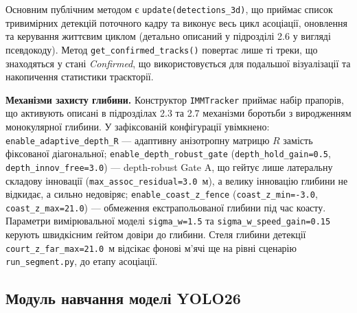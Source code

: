 Основним публічним методом є \texttt{update(detections\_3d)}, що приймає список
тривимірних детекцій поточного кадру та виконує весь цикл асоціації, оновлення та
керування життєвим циклом (детально описаний у підрозділі 2.6 у вигляді псевдокоду).
Метод \texttt{get\_confirmed\_tracks()} повертає лише ті треки, що знаходяться у
стані \textit{Confirmed}, що використовується для подальшої візуалізації та
накопичення статистики траєкторії.

\textbf{Механізми захисту глибини.} Конструктор \texttt{IMMTracker} приймає набір
прапорів, що активують описані в підрозділах 2.3 та 2.7 механізми боротьби з
виродженням монокулярної глибини. У зафіксованій конфігурації увімкнено:
\texttt{enable\_adaptive\_depth\_R} --- адаптивну анізотропну матрицю $R$ замість
фіксованої діагональної; \texttt{enable\_depth\_robust\_gate}
(\texttt{depth\_hold\_gain=0.5}, \texttt{depth\_innov\_free=3.0}) --- depth-robust
Gate A, що гейтує лише латеральну складову інновації
(\texttt{max\_assoc\_residual=3.0}~м), а велику інновацію глибини не відкидає, а
сильно недовіряє; \texttt{enable\_coast\_z\_fence} (\texttt{coast\_z\_min=-3.0},
\texttt{coast\_z\_max=21.0}) --- обмеження екстрапольованої глибини під час
коасту. Параметри вимірювальної моделі \texttt{sigma\_w=1.5} та
\texttt{sigma\_w\_speed\_gain=0.15} керують швидкісним ґейтом довіри до глибини.
Стеля глибини детекції \texttt{court\_z\_far\_max=21.0}~м відсікає фонові м'ячі ще
на рівні сценарію \texttt{run\_segment.py}, до етапу асоціації.

\subsection{Модуль навчання моделі \gls{YOLO}26}


